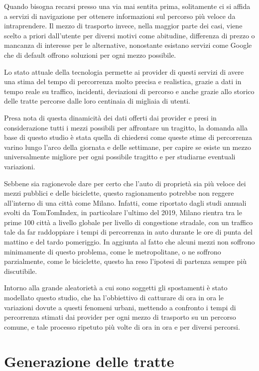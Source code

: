 Quando bisogna recarsi presso una via mai sentita prima, solitamente ci si affida a servizi di navigazione per ottenere informazioni sul percorso più veloce da intraprendere.
Il mezzo di trasporto invece, nella maggior parte dei casi, viene scelto a priori dall'utente per diversi motivi come abitudine, differenza di prezzo o mancanza di interesse per le alternative, nonostante esistano servizi come Google che di default offrono soluzioni per ogni mezzo possibile.

Lo stato attuale della tecnologia permette ai provider di questi servizi di avere una stima del tempo di percorrenza molto precisa e realistica, grazie a dati in tempo reale su traffico, incidenti, deviazioni di percorso e anche grazie allo storico delle tratte percorse dalle loro centinaia di migliaia di utenti.

Presa nota di questa dinamicità dei dati offerti dai provider e presi in considerazione tutti i mezzi possibili per affrontare un tragitto, la domanda alla base di questo studio è stata quella di chiedersi come queste stime di percorrenza varino lungo l'arco della giornata e delle settimane, per capire se esiste un mezzo universalmente migliore per ogni possibile tragitto e per studiarne eventuali variazioni.

Sebbene sia ragionevole dare per certo che l'auto di proprietà sia più veloce dei mezzi pubblici e delle biciclette, questo ragionamento potrebbe non reggere all'interno di una città come Milano. Infatti, come riportato dagli studi annuali svolti da TomTomIndex, in particolare l'ultimo del 2019\cite{tomtomindexmilan}, Milano rientra tra le prime 100 città a livello globale per livello di congestione stradale, con un traffico tale da far raddoppiare i tempi di percorrenza in auto durante le ore di punta del mattino e del tardo pomeriggio. In aggiunta al fatto che alcuni mezzi non soffrono minimamente di questo problema, come le metropolitane, o ne soffrono parzialmente, come le biciclette, questo ha reso l'ipotesi di partenza sempre più discutibile.

Intorno alla grande aleatorietà a cui sono soggetti gli spostamenti è stato modellato questo studio, che ha l'obbiettivo di catturare di ora in ora le variazioni dovute a questi fenomeni urbani, mettendo a confronto i tempi di percorrenza stimati dai provider per ogni mezzo di trasporto su un percorso comune, e tale processo ripetuto più volte di ora in ora e per diversi percorsi.

\section{Generazione delle tratte}

